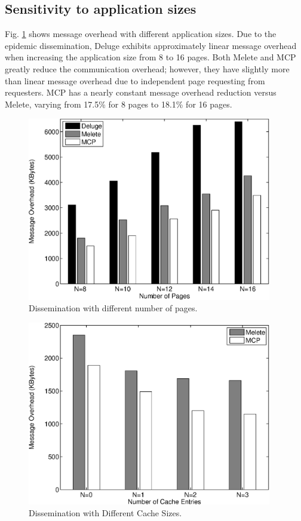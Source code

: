 \subsection{Sensitivity to application sizes}
Fig. \ref{fnumPage} shows message overhead with different application sizes. 
Due to the epidemic dissemination, Deluge exhibits approximately linear message overhead when
increasing the application size from 8 to 16 pages. Both Melete and MCP greatly reduce the communication overhead; 
however, they have slightly more than linear message overhead due to independent page requesting from requesters. MCP 
has a nearly constant message overhead reduction versus Melete, varying from 17.5\% for 8 pages to 18.1\% for 16 pages.

\begin{figure}[htbp]
\centering
\includegraphics[width=4.2in]{figures/fdist2.eps}
\caption{Dissemination with different number of pages.}
\label{fnumPage}
\end{figure}
\begin{figure}[htbp]
\centering
\includegraphics[width=4.2in]{figures/fcache.eps}
\caption{Dissemination with Different Cache Sizes.}
\label{fcache}
\vspace{-0.2in}
\end{figure}


